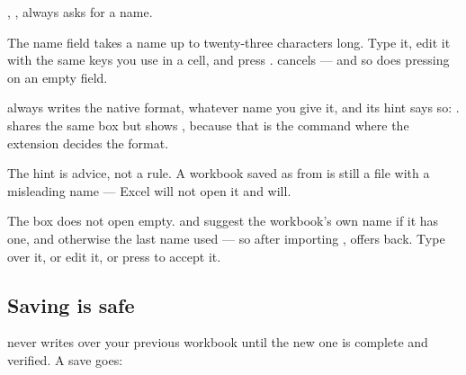 , , always asks for a name.

\begin{ccfigure}
\caption{Typing a name for a workbook}
\label{fig:nameprompt}
\end{ccfigure}

The name field takes a name up to twenty-three characters long. Type it, edit it
with the same keys you use in a cell, and press . 
cancels --- and so does pressing  on an empty field.

\begin{ccnote}
 always writes the native  format, whatever name
you give it, and its hint says so: . 
shares the same box but shows , because that is the command where the extension decides the format.

The hint is advice, not a rule. A workbook saved as  from
 is still a  file with a misleading name ---
Excel will not open it and \ccprod{} will.
\end{ccnote}

\begin{ccnote}
The box does not open empty.  and  suggest
the workbook's own name if it has one, and otherwise the last name used --- so
after importing ,  offers
 back. Type over it, or edit it, or press  to
accept it.
\end{ccnote}

\subsection{Saving is safe}

\ccprod{} never writes over your previous workbook until the new one is
complete and verified. A save goes:

